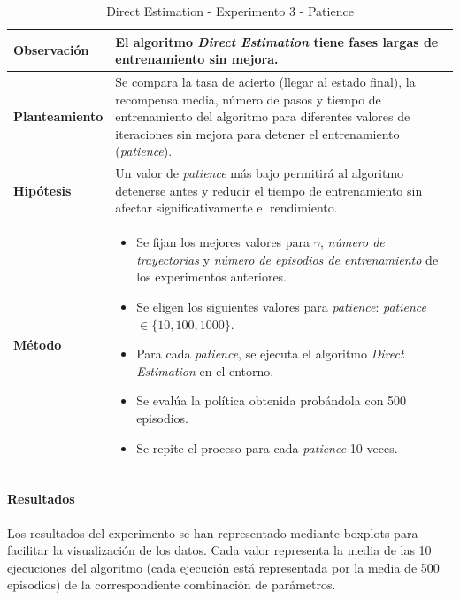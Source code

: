 \begin{table}[H]
    \centering
    \begin{tabularx}{\textwidth}{|p{4cm}|X|} %
        \hline %
        \textbf{Observación} & El algoritmo \textit{Direct Estimation} tiene fases largas de entrenamiento sin mejora.
        \\ \hline
        \textbf{Planteamiento} & Se compara la tasa de acierto (llegar al estado final), la recompensa media, número de pasos y tiempo de entrenamiento del algoritmo para diferentes valores de iteraciones sin mejora para detener el entrenamiento (\textit{patience}).
        \\ \hline
        \textbf{Hipótesis} & Un valor de \textit{patience} más bajo permitirá al algoritmo detenerse antes y reducir el tiempo de entrenamiento sin afectar significativamente el rendimiento.
        \\ \hline
        \textbf{Método} & 
        \begin{itemize}
            \item Se fijan los mejores valores para \(\gamma\), \textit{número de trayectorias} y \textit{número de episodios de entrenamiento} de los experimentos anteriores.
            \item Se eligen los siguientes valores para \textit{patience}: \textit{patience} \(\in \{10, 100, 1000\}\).
            \item Para cada \textit{patience}, se ejecuta el algoritmo \textit{Direct Estimation} en el entorno.
            \item Se evalúa la política obtenida probándola con 500 episodios.
            \item Se repite el proceso para cada \textit{patience} 10 veces.
        \end{itemize}
        \\ \hline
    \end{tabularx}
    \caption{Direct Estimation - Experimento 3 - Patience}
    \label{tab:diseñoDirectEstimationExp3}
\end{table}

\paragraph{Resultados}

Los resultados del experimento se han representado mediante boxplots para facilitar la visualización de los datos. Cada valor representa la media de las 10 ejecuciones del algoritmo (cada ejecución está representada por la media de 500 episodios) de la correspondiente combinación de parámetros. 

